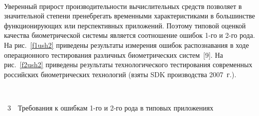 \begin{multicols}{2}
\begin{figure*} %
\vspace*{1pt}
\begin{center}
\mbox{%
\epsfxsize=166.213mm  
}
\end{center}
\vspace*{-9pt}
\begin{minipage}[t]{79mm}
  \end{minipage}
  \hfill
  \begin{minipage}[t]{79mm}
  \end{minipage}
  \end{figure*}
  
  Уверенный прирост производительности вы\-чис\-ли\-тель\-ных средств позволяет в 
значительной степени пренебрегать временными характеристиками в 
большинстве функционирующих или перспективных приложений. Поэтому 
типовой оценкой качества биометрической системы является %
соот\-но\-ше\-ние 
ошибок 1-го и 2-го рода. На рис.~\ref{f1ush2} приведены результаты измерения 
ошибок распознавания в ходе операционного тестирования различных 
биометрических систем~[9]. На рис.~\ref{f2ush2}  приведены результаты 
технологического тестирования современных российских биометрических 
технологий (взяты SDK производства 2007~г.).
  


\begin{center}
\mbox{%
\epsfxsize=78.826mm  
 }
\end{center}
\vspace*{3pt}
{{\figurename~3}\ \ \small{Требования к ошибкам 1-го и 2-го рода в типовых приложениях}}
\bigskip
\addtocounter{figure}{1}  


\end{multicols}
